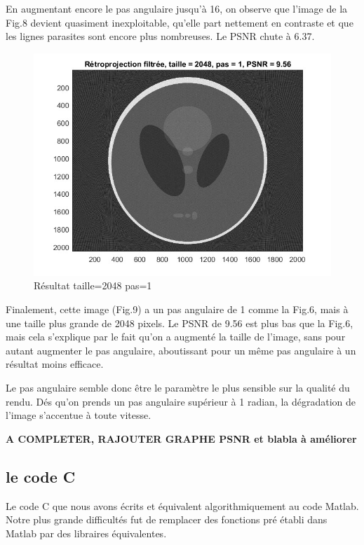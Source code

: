 \documentclass[conference]{IEEEtran}
\begin{document}
En augmentant encore le pas angulaire jusqu'à 16, on observe que l'image de la Fig.8 devient quasiment inexploitable, qu'elle part nettement en contraste et que les lignes parasites sont encore plus nombreuses. Le PSNR chute à 6.37.


\begin{figure}[H]
\centering
\includegraphics[scale=0.5]{t2048-p1}
	\caption[Résultat taille=2048 pas=1]{Résultat taille=2048 pas=1}
\label{fig:gallery}
\end{figure}

Finalement, cette image (Fig.9) a un pas angulaire de 1 comme la Fig.6, mais à une taille plus grande de 2048 pixels. Le PSNR de 9.56 est plus bas que la Fig.6, mais cela s'explique par le fait qu'on a augmenté la taille de l'image, sans pour autant augmenter le pas angulaire, aboutissant pour un même pas angulaire à un résultat moins efficace.

Le pas angulaire semble donc être le paramètre le plus sensible sur la qualité du rendu. Dés qu'on prends un pas angulaire supérieur à 1 radian, la dégradation de l'image s'accentue à toute vitesse.

\textbf{A COMPLETER, RAJOUTER GRAPHE PSNR et blabla à améliorer}


\subsection{le code C}

Le code C que nous avons écrits et équivalent algorithmiquement au code Matlab. Notre plus grande difficultés fut de remplacer des fonctions pré établi dans Matlab par des libraires équivalentes.
\end{document}
